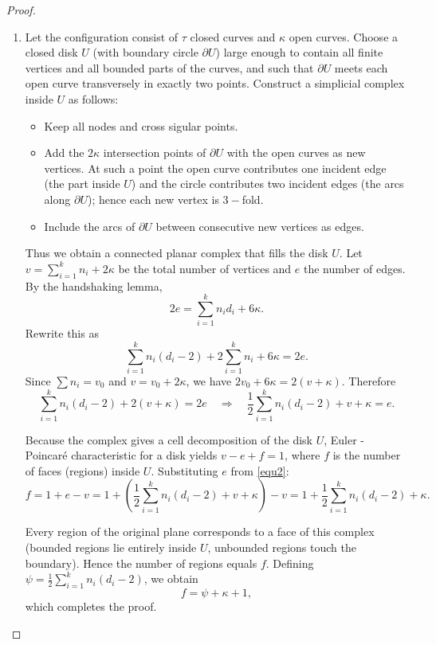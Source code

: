 \documentclass[article,11pt]{amsart} \numberwithin{equation}{section}
\numberwithin{equation}{section}
\begin{document}
{\begin{proof}
\begin{enumerate}
		\item[(ii)] Let the configuration consist of $\tau$ closed curves and $\kappa$ open curves. Choose a closed disk $U$ (with boundary circle $\partial U$) large enough to contain all finite vertices and all bounded parts of the curves, and such that $\partial U$ meets each open curve transversely in exactly two points.  
		Construct a simplicial complex inside $U$ as follows:
		\begin{itemize}
			\item Keep all nodes and cross sigular points.
			\item Add the $2\kappa$ intersection points of $\partial U$ with the open curves as new vertices. At such a point the open curve contributes one incident edge (the part inside $U$) and the circle contributes two incident edges (the arcs along $\partial U$); hence each new vertex is $3-$fold.
			\item Include the arcs of $\partial U$ between consecutive new vertices as edges.
		\end{itemize}
		Thus we obtain a connected planar complex that fills the disk $U$.  
		Let $v = \sum_{i=1}^k n_i + 2\kappa$ be the total number of vertices and $e$ the number of edges. By the handshaking lemma,
		\[
		2e = \sum_{i=1}^k n_i d_i + 6\kappa.
		\]
		Rewrite this as
		\[
		\sum_{i=1}^k n_i(d_i-2) + 2\sum_{i=1}^k n_i + 6\kappa = 2e.
		\]
		Since $\sum n_i = v_0$ and $v = v_0 + 2\kappa$, we have $2v_0 + 6\kappa = 2(v+\kappa)$. Therefore
		\begin{equation}\label{equ2}
			\sum_{i=1}^k n_i(d_i-2) + 2(v+\kappa) = 2e
			\quad\Longrightarrow\quad
			\frac12\sum_{i=1}^k n_i(d_i-2) + v + \kappa = e.
		\end{equation}
		
		Because the complex gives a cell decomposition of the disk $U$, Euler - Poincaré characteristic for a disk yields $v - e + f = 1$, where $f$ is the number of faces (regions) inside $U$. Substituting $e$ from \ref{equ2}:
		\[
		f = 1 + e - v = 1 + \left( \frac12\sum_{i=1}^k n_i(d_i-2) + v + \kappa \right) - v
		= 1 + \frac12\sum_{i=1}^k n_i(d_i-2) + \kappa.
		\]
		
		Every region of the original plane corresponds to a face of this complex (bounded regions lie entirely inside $U$, unbounded regions touch the boundary). Hence the number of regions equals $f$. Defining $\psi = \frac12\sum_{i=1}^k n_i(d_i-2)$, we obtain
		\[
		f = \psi + \kappa + 1,
		\]
		which completes the proof.
		
		
	\end{enumerate}
	

\end{proof}}
\end{document}
